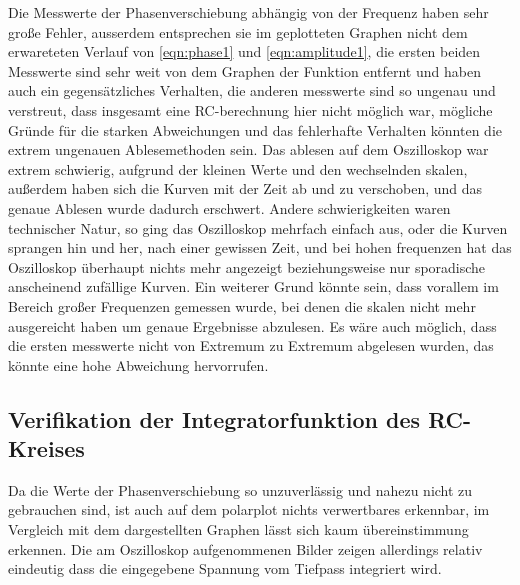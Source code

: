 Die Messwerte der Phasenverschiebung abhängig von der Frequenz haben sehr große Fehler, ausserdem entsprechen sie im geplotteten Graphen nicht dem erwareteten Verlauf von \ref{eqn:phase1} und \ref{eqn:amplitude1}, die ersten beiden Messwerte sind sehr weit von dem Graphen der Funktion entfernt und haben auch ein gegensätzliches Verhalten, die anderen messwerte sind so ungenau und verstreut, dass insgesamt eine RC-berechnung hier nicht möglich war,
mögliche Gründe für die starken Abweichungen und das fehlerhafte Verhalten könnten die extrem ungenauen Ablesemethoden sein. Das ablesen auf dem Oszilloskop war extrem schwierig, aufgrund der kleinen Werte und den wechselnden skalen, außerdem haben sich die Kurven mit der Zeit ab und zu verschoben, und das genaue Ablesen wurde dadurch erschwert. Andere schwierigkeiten waren technischer Natur, so ging das Oszilloskop mehrfach einfach aus, oder die Kurven sprangen hin und her, nach einer gewissen Zeit, und bei hohen frequenzen hat das Oszilloskop überhaupt nichts mehr angezeigt beziehungsweise nur sporadische anscheinend zufällige Kurven.
Ein weiterer Grund könnte sein, dass vorallem im Bereich großer Frequenzen gemessen wurde, bei denen die skalen nicht mehr ausgereicht haben um genaue Ergebnisse abzulesen.
Es wäre auch möglich, dass die ersten messwerte nicht von Extremum zu Extremum abgelesen wurden, das könnte eine hohe Abweichung hervorrufen.

\subsection{Verifikation der Integratorfunktion des RC-Kreises}

Da die Werte der Phasenverschiebung so unzuverlässig und nahezu nicht zu gebrauchen sind, ist auch auf dem polarplot nichts verwertbares erkennbar, im Vergleich mit dem dargestellten Graphen lässt sich kaum übereinstimmung erkennen. Die am Oszilloskop aufgenommenen Bilder zeigen allerdings relativ eindeutig dass die eingegebene Spannung
vom Tiefpass integriert wird.




